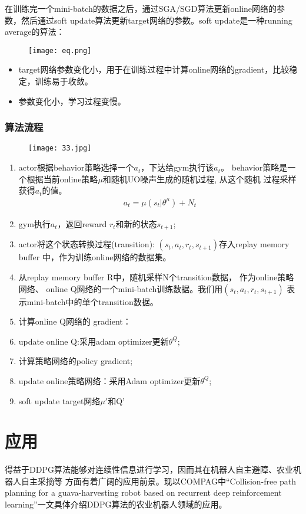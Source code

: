 \documentclass[12pt]{article}
\begin{document}
在训练完一个mini-batch的数据之后，通过SGA/SGD算法更新online网络的参数，然后通过soft update算法更新target网络的参数。soft update是一种running average的算法：
\begin{figure}[htbp]
	\centering
	\texttt{[image: eq.png]}
\end{figure}
\begin{itemize}
	\item target网络参数变化小，用于在训练过程中计算online网络的gradient，比较稳定，训练易于收敛。
	\item 参数变化小，学习过程变慢。
\end{itemize}

\subsubsection{算法流程}
\begin{figure}[htbp]
	\centering
	\texttt{[image: 33.jpg]}
\end{figure}

\begin{enumerate}
	\item actor根据behavior策略选择一个$a_t$，下达给gym执行该$a_t$。
	behavior策略是一个根据当前online策略$\mu$和随机UO噪声生成的随机过程, 从这个随机 过程采样 获得$a_t$的值。
	\begin{align}
		a_t=\mu(s_t|\theta^\mu)+N_t
	\end{align}
	\item  gym执行$a_t$，返回reward $r_t$和新的状态$s_{t+1}$;
	\item actor将这个状态转换过程(transition): $(s_t,a_t,r_t,s_{t+1})$存入replay memory buffer 中，作为训练online网络的数据集。
	\item 从replay memory buffer R中，随机采样N个transition数据，
	作为online策略网络、 online Q网络的一个mini-batch训练数据。我们用$(s_t,a_t,r_t,s_{t+1})$
	表示mini-batch中的单个transition数据。
	\item 计算online Q网络的 gradient：
	\item update online Q:采用adam optimizer更新$\theta^Q$;
	\item 计算策略网络的policy gradient;
	\item update online策略网络：采用Adam optimizer更新$\theta^Q$;
	\item soft update target网络$\mu'$和Q'
\end{enumerate}

\section{应用}
得益于DDPG算法能够对连续性信息进行学习，因而其在机器人自主避障、农业机器人自主采摘等
方面有着广阔的应用前景。现以COMPAG中“Collision-free path planning for a guava-harvesting robot based on 
recurrent deep reinforcement learning”一文具体介绍DDPG算法的农业机器人领域的应用。
\end{document}
